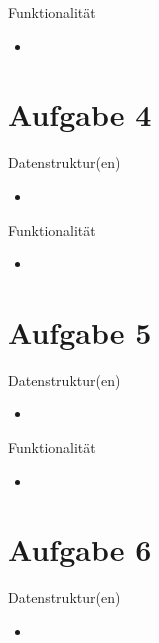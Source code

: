 \documentclass{beamer}
\begin{document}
    \begin{frame}{Funktionalität}
    	\begin{itemize}
    		\setlength\itemsep{1em}
    		\item 
    	\end{itemize}
    \end{frame}

    \section{Aufgabe 4}
    \begin{frame}{Datenstruktur(en)}
    	\begin{itemize}
    		\setlength\itemsep{1em}
    		\item 
    	\end{itemize}
    \end{frame}
    
    \begin{frame}{Funktionalität}
    	\begin{itemize}
    		\setlength\itemsep{1em}
    		\item 
    	\end{itemize}
    \end{frame}
    
    \section{Aufgabe 5}
    \begin{frame}{Datenstruktur(en)}
    	\begin{itemize}
    		\setlength\itemsep{1em}
    		\item 
    	\end{itemize}
    \end{frame}
    
    \begin{frame}{Funktionalität}
    	\begin{itemize}
    		\setlength\itemsep{1em}
    		\item 
    	\end{itemize}
    \end{frame}
    
    \section{Aufgabe 6}
    \begin{frame}{Datenstruktur(en)}
    	\begin{itemize}
    		\setlength\itemsep{1em}
    		\item 
    	\end{itemize}
    \end{frame}
    
\end{document}
